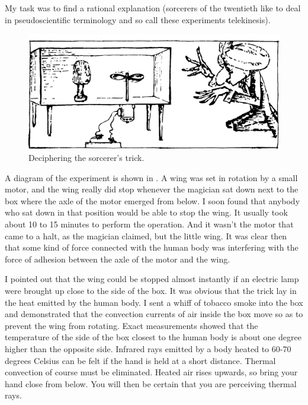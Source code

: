 My task was to find a rational explanation (sorcerers of the twentieth like to deal in pseudoscientific terminology and so call these experiments telekinesis).

\begin{figure}[!ht]
\centering
\includegraphics[width=\textwidth]{figures/fig-01-02.pdf}
\caption{Deciphering the sorcerer's trick.}
\label{fig-1.2}
\end{figure}

A diagram of the experiment is shown in . A wing was set in rotation by a small motor, and the wing really did stop whenever the magician sat down next to the box where the axle of the motor emerged from below. I soon found that anybody who sat down in that position would be able to stop the wing. It usually took about 10 to 15 minutes to perform the operation. And it wasn’t the motor that came to a halt, as the magician claimed, but the little wing. It was clear then that some kind of force connected with the human body was interfering with the force of adhesion between the axle of the motor and the wing.

I pointed out that the wing could be stopped almost instantly if an electric lamp were brought up close to the side of the box. It was obvious that the trick lay in the heat emitted by the human body. I sent a whiff of tobacco smoke into the box and demonstrated that the convection currents of air inside the box move so as to prevent the wing from rotating. Exact measurements showed that the temperature of the side of the box closest to the human body is about one degree higher than the opposite side. Infrared rays emitted by a body heated to 60-70 degrees Celsius can be felt if the hand is held at a short distance. Thermal convection of course must be eliminated. Heated air rises upwards, so bring your hand close from below. You will then be certain that you are perceiving thermal rays.

